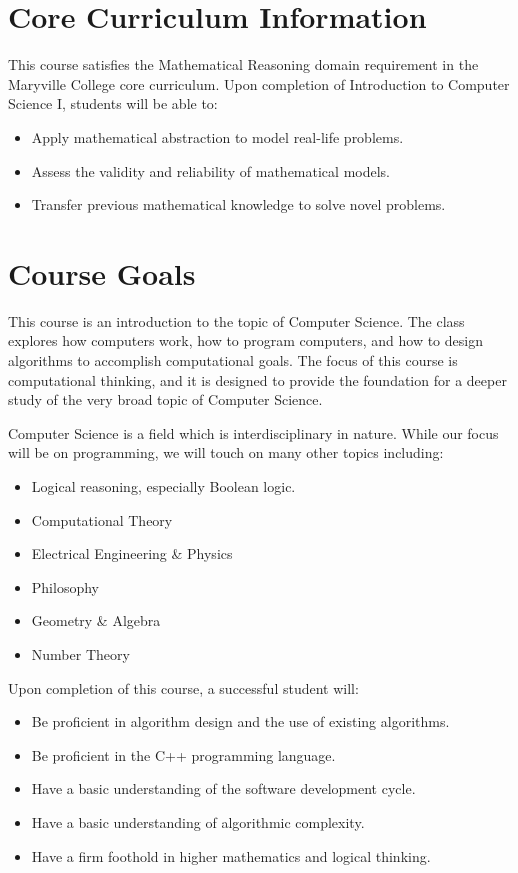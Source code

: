 \documentclass[11pt]{article}
\begin{document}
\section*{Core Curriculum Information}
This course satisfies the Mathematical Reasoning domain requirement in
the Maryville College core curriculum.  Upon completion of
Introduction to Computer Science I, students will be able to:
\begin{itemize}
    \item Apply mathematical abstraction to model real-life problems.
    \item Assess the validity and reliability of mathematical models.
    \item Transfer previous mathematical knowledge to solve novel
    problems.
\end{itemize}

\section*{Course Goals}
This course is an introduction to the topic of Computer Science. The
class explores how computers work, how to program computers, and how
to design algorithms to accomplish computational goals. The focus of
this course is computational thinking, and it is designed to provide
the foundation for a deeper study of the very broad topic of Computer
Science.

Computer Science is a field which is interdisciplinary in nature.
While our focus will be on programming, we will touch on many other
topics including: 
\begin{itemize}
    \item Logical reasoning, especially Boolean logic.
    \item Computational Theory
    \item Electrical Engineering \& Physics
    \item Philosophy
    \item Geometry \& Algebra
    \item Number Theory
\end{itemize}

Upon completion of this course, a successful student will:
\begin{itemize}
    \item Be proficient in algorithm design and the use of existing
     algorithms.
    \item Be proficient in the C++ programming language.
    \item Have a basic understanding of the software development cycle.
    \item Have a basic understanding of algorithmic complexity.
    \item Have a firm foothold in higher mathematics and logical thinking.
\end{itemize}
\end{document}
